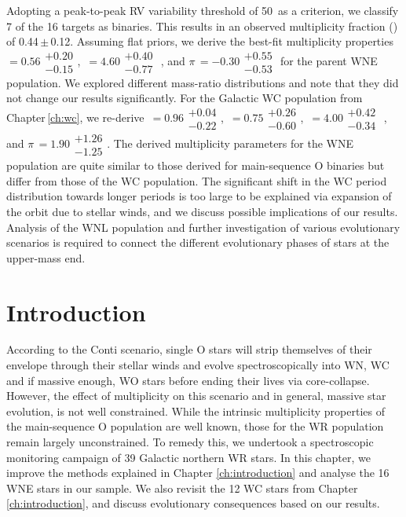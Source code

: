 \begin{abs}
Adopting a peak-to-peak RV variability threshold of 50\,\kms{} as a criterion, we classify 7 of the 16 targets as binaries. This results in an observed multiplicity fraction (\fobsWNE{}) of 0.44\,$\pm$\,0.12. Assuming flat priors, we derive the best-fit multiplicity properties \fintWNE{}\,$= 0.56\substack{+0.20 \\ -0.15}$, \logPmax{}\,$= 4.60\substack{+0.40 \\ -0.77}$ , and $\pi$\,$= -0.30\substack{+0.55 \\ -0.53}$ for the parent WNE population. We explored different mass-ratio distributions and note that they did not change our results significantly. For the Galactic WC population from Chapter\,\ref{ch:wc}, we re-derive \fintWC{}\,$= 0.96\substack{+0.04 \\ -0.22}$, \logPmin{}\,$= 0.75\substack{+0.26 \\ -0.60}$, \logPmax{}\,$= 4.00\substack{+0.42 \\ -0.34}$ , and $\pi$\,$= 1.90\substack{+1.26 \\ -1.25}$.
The derived multiplicity parameters for the WNE population are quite similar to those derived for main-sequence O binaries but differ from those of the WC population. The significant shift in the WC period distribution towards longer periods is too large to be explained via expansion of the orbit due to stellar winds, and we discuss possible implications of our results. Analysis of the WNL population and further investigation of various evolutionary scenarios is required to connect the different evolutionary phases of stars at the upper-mass end.
\end{abs}

\section{Introduction}

According to the Conti scenario, single O stars will strip themselves of their envelope through their stellar winds and evolve spectroscopically into WN, WC and if massive enough, WO stars before ending their lives via core-collapse. However, the effect of multiplicity on this scenario and in general, massive star evolution, is not well constrained. While the intrinsic multiplicity properties of the main-sequence O population are well known, those for the WR population remain largely unconstrained. To remedy this, we undertook a spectroscopic monitoring campaign of 39 Galactic northern WR stars. In this chapter, we improve the methods explained in Chapter \ref{ch:introduction} and analyse the 16 WNE stars in our sample. We also revisit the 12 WC stars from Chapter \ref{ch:introduction}, and discuss evolutionary consequences based on our results.

